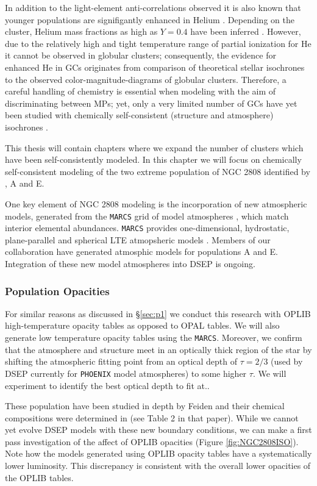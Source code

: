 In addition to the light-element anti-correlations observed it is also known
that younger populations are signifigantly enhanced in Helium
\citep{Piotto2007, Piotto2015, Latour2019}. Depending on the cluster, Helium
mass fractions as high as $Y=0.4$ have been inferred \citep[e.g][]{Milone2015}.
However, due to the relatively high and tight temperature range of partial
ionization for He it cannot be observed in globular clusters; consequently, the
evidence for enhanced He in GCs originates from comparison of theoretical
stellar isochrones to the observed color-magnitude-diagrams of globular
clusters. Therefore, a careful handling of chemistry is essential when modeling
with the aim of discriminating between MPs; yet, only a very limited number of
GCs have yet been studied with chemically self-consistent (structure and
atmosphere) isochrones \citep[e.g.][NGC 6752]{Dotter2015}.

This thesis will contain chapters where we expand the number of clusters which
have been self-consistently modeled. In this chapter we will focus on
chemically self-consistent modeling of the two extreme population of NGC 2808
identified by \citep{Milone2015}, A and E.

One key element of NGC 2808 modeling is the incorporation of new atmospheric
models, generated from the \texttt{MARCS} grid of model atmospheres \citep{Plez2008},
which match interior elemental abundances. \texttt{MARCS} provides one-dimensional,
hydrostatic, plane-parallel and spherical LTE atmopsheric models
\citep{Gustafsson2008}. Members of our collaboration have generated atmosphic
models for populations A and E.  Integration of these new model atmospheres
into DSEP is ongoing. 

\subsubsection{Population Opacities}
For similar reasons as discussed in \S\ref{sec:p1} we conduct this research
with OPLIB high-temperature opacity tables as opposed to OPAL tables. We will
also generate low temperature opacity tables using the \texttt{MARCS}.
Moreover, we confirm that the atmosphere and structure meet in an optically
thick region of the star by shifting the atmospheric fitting point from an optical
depth of $\tau = 2/3$ (used by DSEP currently for \texttt{PHOENIX} model atmospheres) to
some higher $\tau$. We will experiment to identify the best optical depth to
fit at.. 

These population have been studied in depth by Feiden and their chemical
compositions were determined in \citet{Milone2015} (see Table 2 in that paper).
While we cannot yet evolve DSEP models with these new boundary conditions, we
can make a first pass investigation of the affect of OPLIB opacities (Figure
\ref{fig:NGC2808ISO}). Note how the models generated using OPLIB opacity tables
have a systematically lower luminosity. This discrepancy is consistent with
the overall lower opacities of the OPLIB tables. 

